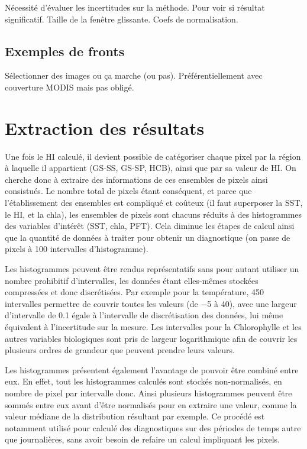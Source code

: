\documentclass[index]{subfiles}
\begin{document}
Nécessité d'évaluer les incertitudes sur la méthode.
Pour voir si résultat significatif.
Taille de la fenêtre glissante. Coefs de normalisation.

\subsection{Exemples de fronts}
\label{sec:HI-exemples}

Sélectionner des images ou ça marche (ou pas).
Préférentiellement avec couverture MODIS mais pas obligé.

\section{Extraction des résultats}
\label{sec:extraction-res}

Une fois le HI calculé, il devient possible de catégoriser chaque pixel par la région à laquelle il appartient (GS-SS, GS-SP, HCB), ainsi que par sa valeur de HI.
On cherche donc à extraire des informations de ces ensembles de pixels ainsi consistués.
Le nombre total de pixels étant conséquent, et parce que l'établissement des ensembles est compliqué et coûteux (il faut superposer la SST, le HI, et la \gls{chla}), les ensembles de pixels sont chacuns réduits à des histogrammes des variables d'intérêt (SST, \gls{chla}, PFT).
Cela diminue les étapes de calcul ainsi que la quantité de données à traiter pour obtenir un diagnostique (on passe de  pixels à \num{100} intervalles d'histogramme).

Les histogrammes peuvent être rendus représentatifs sans pour autant utiliser un nombre prohibitif d'intervalles, les données étant elles-mêmes stockées compressées et donc discrétisées. Par exemple pour la température, 450 intervalles permettre de couvrir toutes les valeurs (de \qty{-5}{\dC} à \qty{40}{\dC}), avec une largeur d'intervalle de \qty{0.1}{\dC} égale à l'intervalle de discrétisation des données, lui même équivalent à l'incertitude sur la mesure.
Les intervalles pour la Chlorophylle et les autres variables biologiques sont pris de largeur logarithmique afin de couvrir les plusieurs ordres de grandeur que peuvent prendre leurs valeurs.

Les histogrammes présentent également l'avantage de pouvoir être combiné entre eux.
En effet, tout les histogrammes calculés sont stockés non-normalisés, en nombre de pixel par intervalle donc. Ainsi plusieurs histogrammes peuvent être sommés entre eux avant d'être normalisés pour en extraire une valeur, comme la valeur médiane de la distribution résultant par exemple.
Ce procédé est notamment utilisé pour calculé des diagnostiques sur des périodes de temps autre que journalières, sans avoir besoin de refaire un calcul impliquant les pixels.
\end{document}
